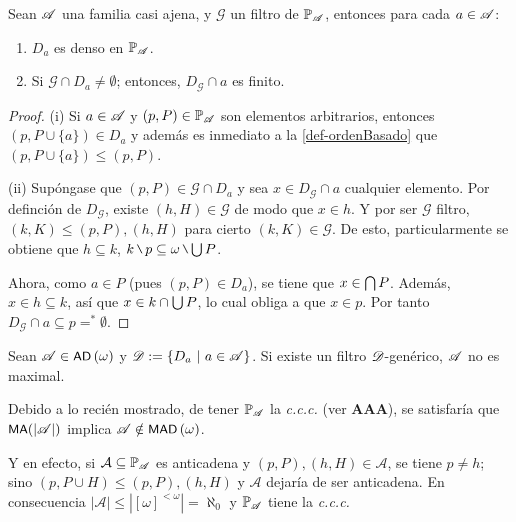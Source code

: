 	\begin{lema}\label{lem-DgMagia}
		Sean $\mathscr{A}$ una familia casi ajena, y $\mathcal{G}$ un filtro de $\mathbb{P}_{\mathscr{A}}$, entonces para cada $a \in \mathscr{A}$:
		\begin{enumerate}
			\item $D_a$ es denso en $\mathbb{P}_{\mathscr{A}}$.
			\item Si $\mathcal{G} \cap D_a \neq \emptyset$; entonces, $D_\mathcal{G} \cap a$ es finito.
		\end{enumerate}
	\end{lema}

	\begin{proof}
		(i) Si $a \in \mathscr{A}$ y $(p,P) \in \mathbb{P}_{\mathscr{A}}$ son elementos arbitrarios, entonces $(p,P\cup\{a\}) \in D_a$ y además es inmediato a la \autoref{def-ordenBasado} que $(p,P\cup\{a\}) \leq (p,P)$.

		(ii) Supóngase que $(p,P) \in \mathcal{G} \cap D_a$ y sea $x \in D_\mathcal{G} \cap a$ cualquier elemento. Por definción de $D_\mathcal{G}$, existe $(h,H) \in \mathcal{G}$ de modo que $x \in h$. Y por ser $\mathcal{G}$ filtro, $(k,K) \leq (p,P),(h,H)$ para cierto $(k,K) \in \mathcal{G}$. De esto, particularmente se obtiene que $h \subseteq k$, $k \setminus p \subseteq \omega \setminus \midcup P$.

		Ahora, como $a \in P$ (pues $(p,P)\in D_a$), se tiene que $x \in \mbox{$\bigcap$}\, P$. Además, $x \in h \subseteq k$, así que $x \in k \cap \mbox{$\bigcup$}\, P$, lo cual obliga a que $x \in p$. Por tanto $D_\mathcal{G} \cap a \subseteq p =^* \emptyset$. 
	\end{proof}

	\begin{corolario}\label{cor-SolovayDebil}
		Sean $\mathscr{A} \in \operatorname{\text{\textsf{\small AD}}}\,(\omega)$ y $\mathscr{D}:=\{D_a \text{ $|$ } a \in \mathscr{A}\}$. Si existe un filtro $\mathscr{D}$-genérico, $\mathscr{A}$ no es maximal.
	\end{corolario}

	Debido a lo recién mostrado, de tener $\mathbb{P}_{\mathscr{A}}$ la \textit{c.c.c.} (ver \textbf{AAA}), se satisfaría que $\text{\textsf{\small MA}}(|\mathscr{A}|)$ implica $\mathscr{A} \notin \operatorname{\text{\textsf{\small MAD}}}\,(\omega)$.

	Y en efecto, si $\mathcal{A} \subseteq \mathbb{P}_{\mathscr{A}}$ es anticadena y $(p,P),(h,H) \in \mathcal{A}$, se tiene $p\neq h$; sino $(p,P \cup H) \leq (p,P),(h,H)$ y $\mathcal{A}$ dejaría de ser anticadena. En consecuencia $|\mathcal{A}|\leq|[\omega]^{<\omega}|=\aleph_0$ y $\mathbb{P}_{\mathscr{A}}$ tiene la \textit{c.c.c.}

